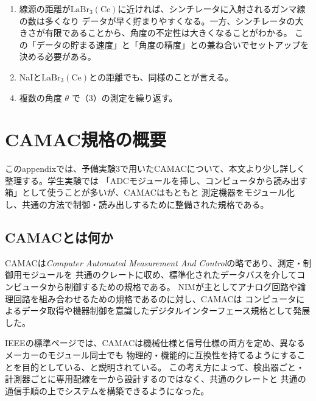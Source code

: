 \documentclass[uplatex,dvipdfmx,12pt,nomag]{jsarticle}
\begin{document}
\begin{enumerate}
  \renewcommand{\labelenumi}{（3\alph{enumi}）}
  \item 線源の距離が$\mathrm{LaBr}_{3}(\mathrm{Ce})$に近ければ、シンチレータに入射されるガンマ線の数は多くなり
  データが早く貯まりやすくなる。一方、シンチレータの大きさが有限であることから、角度の不定性は大きくなることがわかる。
  この「データの貯まる速度」と「角度の精度」との兼ね合いでセットアップを決める必要がある。
  \item NaIと$\mathrm{LaBr}_{3}(\mathrm{Ce})$との距離でも、同様のことが言える。
\end{enumerate}

\begin{enumerate}
  \setcounter{enumi}{3}
  \renewcommand{\labelenumi}{（\arabic{enumi}）}
  \item 複数の角度 $\theta$ で（3）の測定を繰り返す。
\end{enumerate}

\appendix

\section{CAMAC規格の概要}

このappendixでは、予備実験3で用いたCAMACについて、本文より少し詳しく整理する。学生実験では
「ADCモジュールを挿し、コンピュータから読み出す箱」として使うことが多いが、CAMACはもともと
測定機器をモジュール化し、共通の方法で制御・読み出しするために整備された規格である\cite{ieee583,camac-intro}。

\subsection{CAMACとは何か}

CAMACは\textit{Computer Automated Measurement And Control}の略であり、測定・制御用モジュールを
共通のクレートに収め、標準化されたデータバスを介してコンピュータから制御するための規格である\cite{ieee583}。
NIMが主としてアナログ回路や論理回路を組み合わせるための規格であるのに対し、CAMACは
コンピュータによるデータ取得や機器制御を意識したデジタルインターフェース規格として発展した。

IEEEの標準ページでは、CAMACは機械仕様と信号仕様の両方を定め、異なるメーカーのモジュール同士でも
物理的・機能的に互換性を持てるようにすることを目的としている、と説明されている\cite{ieee583}。
この考え方によって、検出器ごと・計測器ごとに専用配線を一から設計するのではなく、共通のクレートと
共通の通信手順の上でシステムを構築できるようになった。
\end{document}
